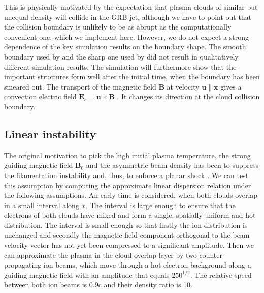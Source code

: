 \documentclass[structabstract]{aa}
\begin{document}
This is physically 
motivated by the expectation that plasma clouds of similar but unequal density will collide in the 
GRB jet, although we have to point out that the collision boundary is unlikely to be as abrupt as 
the computationally convenient one, which we implement here. However, we do not expect a strong 
dependence of the key simulation results on the boundary shape. The smooth boundary used by 
\citet{Bessho:1999sf} and the sharp one used by \citet{Dieckmann:2008dp} did not result in qualitatively 
different simulation results. The simulation will furthermore show that the important structures form 
well after the initial time, when the boundary has been smeared out. The transport of the magnetic field 
$\mathbf{B}$ at velocity $\mathbf{u}\parallel \mathbf{x}$ gives a convection electric field $\mathbf{E}_c
= \mathbf{u}\times \mathbf{B}$ \citep{Baumjohann:1996ao}. It changes its direction at the cloud collision 
boundary.

\subsection{Linear instability}

The original motivation to pick the high initial plasma temperature, the strong guiding magnetic field 
$\mathbf{B}_0$ and the asymmetric beam density has been to suppress the filamentation instability and,
thus, to enforce a planar shock \citep{Dieckmann:2008dp}. We can test this assumption by computing the 
approximate linear dispersion relation under the following assumptions. An early time is considered, 
when both clouds overlap in a small interval along $x$. The interval is large enough to ensure that the 
electrons of both clouds have mixed and form a single, spatially uniform and hot distribution. The 
interval is small enough so that firstly the ion distribution is unchanged and secondly the magnetic 
field component orthogonal to the beam velocity vector has not yet been compressed to a significant 
amplitude. Then we can approximate the plasma in the cloud overlap layer by two counter-propagating ion 
beams, which move through a hot electron background along a guiding magnetic field with an amplitude 
that equals $250^{1/2}$. The relative speed between both ion beams is 0.9c and their density ratio is 10. 
\end{document}
